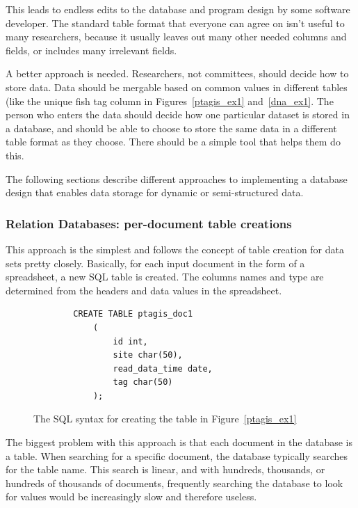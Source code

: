 This leads to endless edits to the database and program design by some software 
developer. The standard table format that everyone can agree on isn't useful to many
researchers, because it usually leaves out many other needed columns and fields,
or includes many irrelevant fields.

A better approach is needed. Researchers, not committees, should decide how to store 
data. Data should be mergable based on common values in different tables (like the 
unique fish tag column in Figures~\ref{ptagis_ex1} and~\ref{dna_ex1}. The 
person who enters the data should decide how one particular dataset is stored in a 
database, and should be able to choose to store the same data in a different table 
format as they choose. There should be a simple tool that helps them do this.

The following sections describe different approaches to implementing a database design
that enables data storage for dynamic or semi-structured data.


\subsubsection{Relation Databases: per-document table creations}
This approach is the simplest and follows the concept of table creation for data sets
pretty closely. Basically, for each input document in the form of a spreadsheet, a new
SQL table is created. The columns names and type are determined from the headers and 
data values in the spreadsheet.

\begin{figure}[h]
	\begin{center}
	\begin{lstlisting}
		CREATE TABLE ptagis_doc1
			(
				id int, 
				site char(50), 
				read_data_time date,
				tag char(50)
			); 
	\end{lstlisting}
	\caption{The SQL syntax for creating the table in Figure~\ref{ptagis_ex1} } 
	\label{ptagis_ex1_sql}
	\end{center}
\end{figure}

The biggest problem with this approach is that each document
in the database is a table. When searching for a specific document, the database 
typically searches for the table name. This search is linear, and with hundreds,
thousands, or hundreds of thousands of documents, frequently searching the database
to look for values would be increasingly slow and therefore useless.

